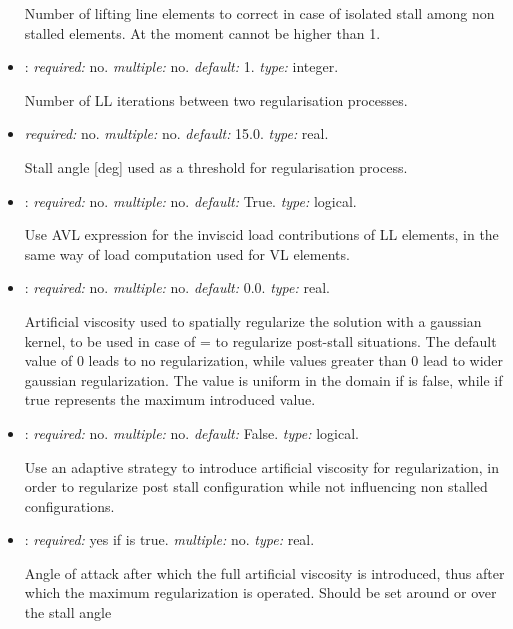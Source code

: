 \begin{itemize}
Number of lifting line elements to correct in case of isolated stall among non stalled elements. At the moment cannot be higher than 1.

\item {}: \textit{required:} no. \textit{multiple:} no. \textit{default:} 1. \textit{type:} integer.

Number of LL iterations between two regularisation processes.

\item {} \textit{required:} no. \textit{multiple:} no. \textit{default:} 15.0. \textit{type:} real.

Stall angle [deg] used as a threshold for regularisation process. 

\item {}: \textit{required:} no. \textit{multiple:} no. \textit{default:} True. \textit{type:} logical.

Use AVL expression for the inviscid load contributions of LL elements, in the same way of load computation used for VL elements.

\item {}: \textit{required:} no. \textit{multiple:} no. \textit{default:} 0.0. \textit{type:} real.

Artificial viscosity used to spatially regularize the solution with a gaussian kernel, to be used in case of  =  to regularize post-stall situations. The default value of 0 leads to no regularization, while values greater than 0 lead to wider gaussian regularization. The value is uniform in the domain if  is false, while if true represents the maximum introduced value.

\item {}: \textit{required:} no. \textit{multiple:} no. \textit{default:} False. \textit{type:} logical.

Use an adaptive strategy to introduce artificial viscosity for regularization, in order to regularize post stall configuration while not influencing non stalled configurations. 

\item {}: \textit{required:} yes if  is true. \textit{multiple:} no. \textit{type:} real.

Angle of attack after which the full artificial viscosity is introduced, thus after which the maximum regularization is operated. Should be set around or over the stall angle


\end{itemize}
